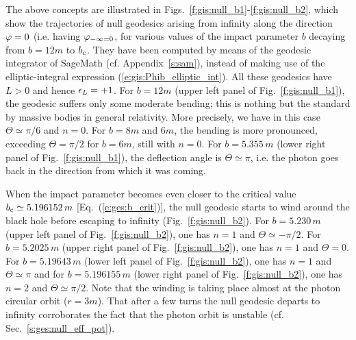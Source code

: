 The above concepts are illustrated in Figs.~\ref{f:gis:null_b1}-\ref{f:gis:null_b2},
which show the trajectories
of null geodesics arising from infinity along the
direction $\varphi=0$ (i.e. having $\varphi_{-\infty=0}$, for various values of the
impact parameter $b$ decaying from $b=12 m$ to $b_{\rm c}$.
They have been computed by means of the geodesic integrator
of \textsf{SageMath} (cf. Appendix~\ref{s:sam}), instead of making use
of the elliptic-integral expression (\ref{e:gis:Phib_elliptic_int}).
All these geodesics have $L>0$ and hence $\epsilon_L = +1$.
For $b=12 m$ (upper left panel of Fig.~\ref{f:gis:null_b1}),
the geodesic suffers only some moderate bending; this is nothing but the standard
 by massive bodies in
general relativity. More precisely, we have in this case $\Theta\simeq \pi/6$ and $n=0$.
For $b=8 m$ and $6 m$, the bending is more pronounced,
exceeding $\Theta = \pi/2$ for $b=6 m$, still with $n=0$. For $b=5.355\, m$ (lower right panel of Fig.~\ref{f:gis:null_b1}), the deflection angle is $\Theta\simeq\pi$, i.e. the photon goes back in the direction
from which it was coming.

When the impact parameter becomes even closer to the critical value
$b_{\rm c}\simeq 5.196152\, m$ [Eq.~(\ref{e:ges:b_crit})],
the null geodesic starts to wind around the black hole before escaping
to infinity (Fig.~\ref{f:gis:null_b2}).
For $b=5.230\, m$ (upper left panel of Fig.~\ref{f:gis:null_b2}), one has
$n=1$ and $\Theta\simeq -\pi/2$.
For $b=5.2025\, m$ (upper right panel of Fig.~\ref{f:gis:null_b2}), one has
$n=1$ and $\Theta=0$. For $b=5.19643\, m$ (lower left panel
of Fig.~\ref{f:gis:null_b2}), one has
$n=1$ and $\Theta\simeq \pi$ and for $b=5.196155\, m$ (lower right panel of Fig.~\ref{f:gis:null_b2}), one has $n=2$ and
$\Theta\simeq \pi/2$.
Note that the winding is taking place
almost at the photon circular orbit ($r=3m$). That after a few turns the null geodesic
departs to infinity corroborates the fact that the photon orbit is unstable
(cf. Sec.~\ref{s:ges:null_eff_pot}).

